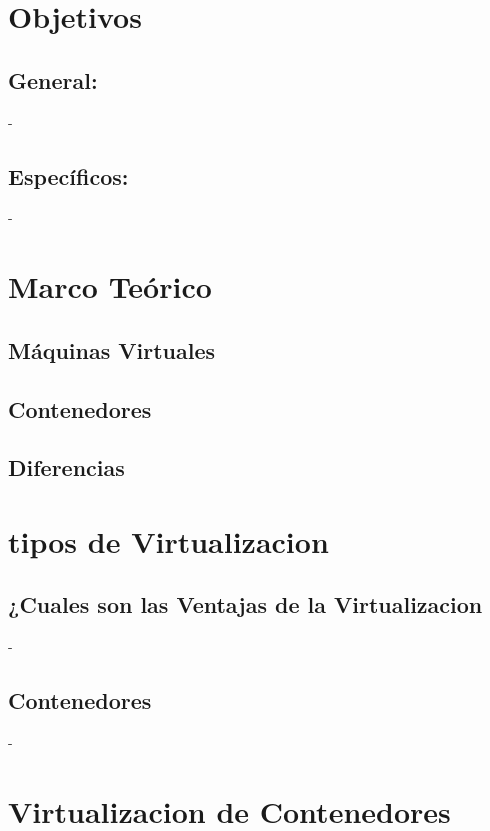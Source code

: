 \documentclass[%
 reprint,
 amsmath,amssymb,
 aps,
]{revtex4-1}
\begin{document}
\section{Objetivos}\label{sec:2}

\subsection{General:}

-  
\subsection{Específicos:}
- 

\section {Marco Teórico}\label{sec:3}


\subsection{Máquinas Virtuales}
\subsection{Contenedores}
\subsection{Diferencias}


\section{tipos de Virtualizacion}\label{sec:4}
\subsection{¿Cuales son las Ventajas de la Virtualizacion}
-  
\subsection{Contenedores}
- 

\section {Virtualizacion de Contenedores}\label{sec:5}
\end{document}
